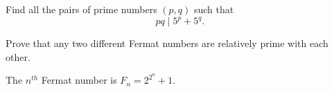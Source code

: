 \documentclass{subfile}
\begin{document}
	\begin{problem}[China 2009]
		Find all the pairs of prime numbers $ (p,q)$ such that $$ pq \mid 5^p+5^q.$$ %
	\end{problem}
	
	
	\begin{problem}
		Prove that any two different Fermat numbers are relatively prime with each other.
	\end{problem}

	\begin{note}
		The $n^{th}$ Fermat number is $F_n = 2^{2^n} + 1$.
	\end{note}
	
	
\end{document}
